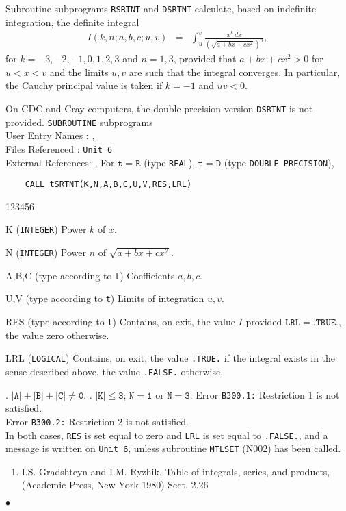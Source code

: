                           
                
\Submitter{}                     
Subroutine subprograms {\tt RSRTNT} and {\tt DSRTNT} calculate, based on
indefinite integration, the definite integral
\begin{eqnarray*}
I(k,n;a,b,c;u,v) & = & \displaystyle \int_u^v
\frac{x^k\,dx}{(\sqrt{a+bx+cx^2})^n},
\end{eqnarray*}
for $k=-3,-2,-1,0,1,2,3$ and $n=1,3$, provided that
$a+bx+cx^2 > 0$ for $u < x < v$ and the limits $u,v$ are such that
the integral converges. In particular, the Cauchy principal value
is taken if $k=-1$ and $uv < 0$.

On CDC and Cray computers, the double-precision version {\tt DSRTNT}
is not provided.
\Structure
{\tt SUBROUTINE} subprograms \\
User Entry   Names : , \\
Files  Referenced : {\tt Unit 6} \\
External References: , 
\Usage
For $\mathtt{t=R}$ (type {\tt REAL}), $\mathtt{t=D}$ (type
{\tt DOUBLE PRECISION}),
\begin{verbatim}
    CALL tSRTNT(K,N,A,B,C,U,V,RES,LRL)
\end{verbatim}
\begin{DLtt}{123456}
\item[K] ({\tt INTEGER}) Power $k$ of $x$.
\item[N] ({\tt INTEGER}) Power $n$ of $\sqrt{a+bx+cx^2}$.
\item[A,B,C] (type according to {\tt t}) Coefficients $a,b,c$.
\item[U,V] (type according to {\tt t}) Limits of integration $u,v$.
\item[RES] (type according to {\tt t}) Contains, on exit, the value
$I$ provided $\mathtt{LRL = .TRUE.}$, the value zero otherwise.
\item[LRL] ({\tt LOGICAL}) Contains, on exit, the value {\tt .TRUE.}
if the integral exists in the sense described above, the value
{\tt .FALSE.} otherwise.
\end{DLtt}
. \quad $\mathtt{|A|+|B|+|C| \ne 0}.$  . \quad $\mathtt{|K| \le 3}$; \quad
$\mathtt{N = 1}$ or $\mathtt{N = 3}$.
\Errorh
Error {\tt B300.1:} Restriction 1 is not satisfied. \\
Error {\tt B300.2:} Restriction 2 is not satisfied. \\
In both cases, {\tt RES} is set equal to zero and {\tt LRL} is set
equal to {\tt .FALSE.}, and a message is written on {\tt Unit 6},
unless subroutine {\tt MTLSET} (N002) has been called.
\Refer
\begin{enumerate}
\item  I.S. Gradshteyn and I.M. Ryzhik, Table of integrals, series,
and products, (Academic Press, New York 1980) Sect. 2.26
\end{enumerate}
$\bullet$
